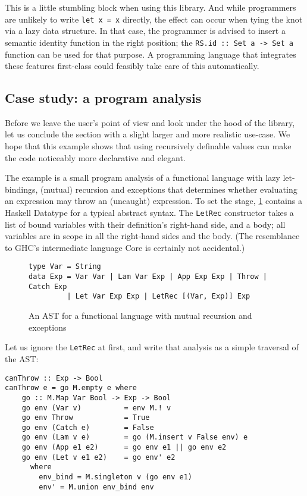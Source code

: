 \documentclass[manuscript,screen,acmsmall]{acmart}
\begin{document}
This is a little stumbling block when using this library. And while programmers are unlikely to write \verb|let x = x| directly, the effect can occur when tying the knot via a lazy data structure. In that case, the programmer is advised to insert a semantic identity function in the right position; the \verb|RS.id :: Set a -> Set a| function can be used for that purpose.
A programming language that integrates these features first-class could feasibly take care of this automatically.

\subsection{Case study: a program analysis}

Before we leave the user's point of view and look under the hood of the library, let us conclude the section with a slight larger and more realistic use-case. We hope that this example shows that using recursively definable values can make the code noticeably more declarative and elegant.

The example is a small program analysis of a functional language with lazy let-bindings, (mutual) recursion and exceptions that determines whether evaluating an expression may throw an (uncaught) expression. To set the stage, \cref{fig:analast} contains a Haskell Datatype for a typical abstract syntax. The \verb|LetRec| constructor takes a list of bound variables with their definition's  right-hand side, and a body; all variables are in scope in all the right-hand sides and the body.
(The resemblance to GHC's intermediate language Core \citep{secrets} is certainly not accidental.)

\begin{figure}
\begin{verbatim}
type Var = String
data Exp = Var Var | Lam Var Exp | App Exp Exp | Throw | Catch Exp
         | Let Var Exp Exp | LetRec [(Var, Exp)] Exp
\end{verbatim}
\caption{An AST for a functional language with mutual recursion and exceptions}
\label{fig:analast}
\end{figure}

Let us ignore the \verb|LetRec| at first, and write that analysis as a simple traversal of the AST:
\begin{verbatim}
canThrow :: Exp -> Bool
canThrow e = go M.empty e where
    go :: M.Map Var Bool -> Exp -> Bool
    go env (Var v)          = env M.! v
    go env Throw            = True
    go env (Catch e)        = False
    go env (Lam v e)        = go (M.insert v False env) e
    go env (App e1 e2)      = go env e1 || go env e2
    go env (Let v e1 e2)    = go env' e2
      where
        env_bind = M.singleton v (go env e1)
        env' = M.union env_bind env
\end{verbatim}
\end{document}
